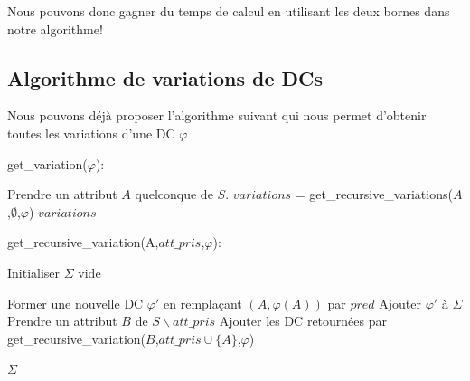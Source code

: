 \documentclass[letterpaper, 12pt]{report}
\theoremstyle{definition}
\begin{document}
Nous pouvons donc gagner du temps de calcul en utilisant les deux bornes dans notre algorithme!

\subsection{Algorithme de variations de DCs}
Nous pouvons déjà proposer l'algorithme suivant qui nous permet d'obtenir toutes les variations d'une DC $\varphi$

\IncMargin{1em}
\begin{algorithm}
\label{variations}

	\DontPrintSemicolon
  \caption{get\_variation($\varphi$):}
  \LinesNumbered

    Prendre un attribut $A$ quelconque de $S$.\;
    $variations$ = get\_recursive\_variations($A$,$\emptyset$,$\varphi$)\;
    \Return $variations$
\end{algorithm}\DecMargin{1em}


\IncMargin{1em}
\begin{algorithm}
\label{variations_rec}

	\DontPrintSemicolon
  \caption{get\_recursive\_variation(A,$att\_pris$,$\varphi$):}
  \LinesNumbered

    Initialiser $\Sigma$ vide\;
    {
    	{
    		Former une nouvelle DC $\varphi'$ en remplaçant $(A,\varphi(A))$ par $pred$\;
    		Ajouter $\varphi'$ à $\Sigma$\;
    		Prendre un attribut $B$ de $S \backslash att\_pris$\;
    		Ajouter les DC retournées par get\_recursive\_variation($B$,$att\_pris \cup \{A\}$,$\varphi$)\;
    		
    	}
    }
    \Return $\Sigma$
\end{algorithm}\DecMargin{1em}
\end{document}

